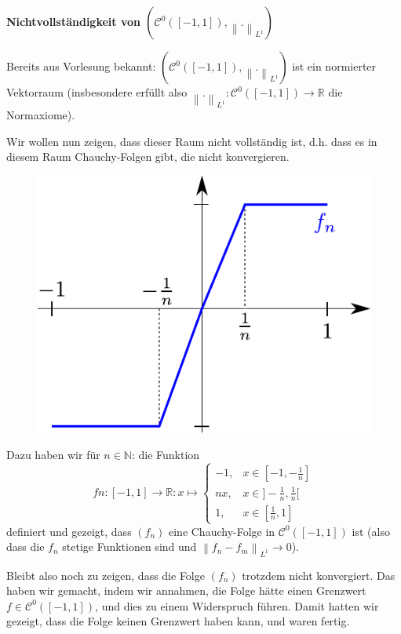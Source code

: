 \documentclass[a4paper,ngerman,12pt,bibtotoc]{scrartcl}
\theoremstyle{definition}
\theoremstyle{plain}
\theoremstyle{remark}
\newcommand{\RR}{\mathbb{R}}
\newcommand{\NN}{\mathbb{N}}
\newcommand{\lInorm}[1]{\left\lVert #1 \right\rVert_{L^1}}
\begin{document}
	\hrulefill
	\vspace{-1em}
	\begin{center}\LARGE\textbf{Nichtvollständigkeit von $\left(\mathcal{C}^0\left(\left[-1,1\right]\right), \lInorm{.}\right)$}\end{center}
	\vspace{-1.4em}
	\hrulefill
	\vspace{-1.4em}
	
	\hrulefill
	
	\vspace{1em}	

	Bereits aus Vorlesung bekannt: $\left(\mathcal{C}^0\left(\left[-1,1\right]\right), \lInorm{.}\right)$ ist ein normierter Vektorraum (insbesondere erfüllt also $\lInorm{.}: \mathcal{C}^0\left(\left[-1,1\right]\right) \to \RR$ die Normaxiome).
	
	Wir wollen nun zeigen, dass dieser Raum nicht vollständig ist, d.h. dass es in diesem Raum Chauchy-Folgen gibt, die nicht konvergieren.
	
	\begin{figure}\vspace{-3em}
		\includegraphics[width=.25\textwidth]{NichtvollstaendigkeitFolge.pdf}
	\vspace{-4em}\end{figure}
	
	Dazu haben wir für $n \in \NN$: die Funktion
		\[fn: [-1,1] \to \RR: x \mapsto \begin{cases}
			-1, &x \in [-1,-\frac{1}{n}] \\
			nx, &x \in ]-\frac{1}{n},\frac{1}{n}[ \\
			1,  &x \in [\frac{1}{n},1]
		\end{cases}\]
	definiert und gezeigt, dass $\left(f_n\right)$ eine Chauchy-Folge in $\mathcal{C}^0\left(\left[-1,1\right]\right)$ ist (also dass die $f_n$ stetige Funktionen sind und $\lInorm{f_n - f_m} \rightarrow 0$).
	
	Bleibt also noch zu zeigen, dass die Folge $(f_n)$ trotzdem nicht konvergiert. Das haben wir gemacht, indem wir annahmen, die Folge hätte einen Grenzwert $f \in \mathcal{C}^0\left(\left[-1,1\right]\right)$, und dies zu einem Widerspruch führen. Damit hatten wir gezeigt, dass die Folge keinen Grenzwert haben kann, und waren fertig.
	
\end{document}
